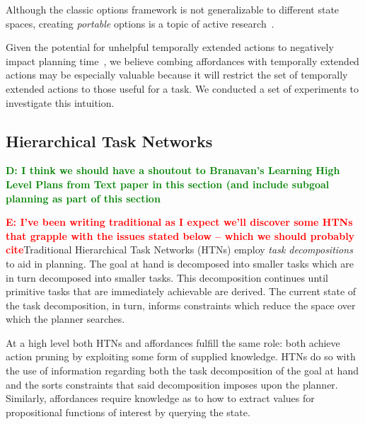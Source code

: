 \documentclass[conference]{IEEEtran}
\newcommand{\dnote}[1]{\textcolor{Green}{\textbf{D: #1}}}
\newcommand{\enote}[1]{\textcolor{Red}{\textbf{E: #1}}}
\begin{document}
Although the classic options framework is not generalizable to different state spaces,
creating {\em portable} options is a topic of active research~\cite{konidaris07,konidaris2009efficient,Ravindran03analgebraic,croonenborghs2008learning,andre2002state,konidaris2012transfer}.

Given the potential for unhelpful temporally extended actions to negatively impact planning time~\cite{Jong:2008zr}, we believe combing affordances with temporally extended actions
may be especially valuable because it will restrict the set of temporally extended actions to those
useful for a task. We conducted a set of experiments to investigate this intuition.

\subsection{Hierarchical Task Networks}

\dnote{I think we should have a shoutout to Branavan's Learning High Level Plans from Text paper in this section (and include subgoal planning as part of this section}

\enote{I've been writing traditional as I expect we'll discover some HTNs that grapple with the issues stated below -- which we should probably cite}Traditional Hierarchical Task Networks (HTNs) employ \textit{task decompositions} to aid in planning. The goal at hand is decomposed into smaller tasks which are in turn decomposed into smaller tasks. This decomposition continues until primitive tasks that are immediately achievable are derived. The current state of the task decomposition, in turn, informs constraints which reduce the space over which the planner searches.

At a high level both HTNs and affordances fulfill the same role: both achieve action pruning by exploiting some form of supplied knowledge. HTNs do so with the use of information regarding both the task decomposition of the goal at hand and the sorts constraints that said decomposition imposes upon the planner. Similarly, affordances require knowledge as to how to extract values for propositional functions of interest by querying the state.
\end{document}
